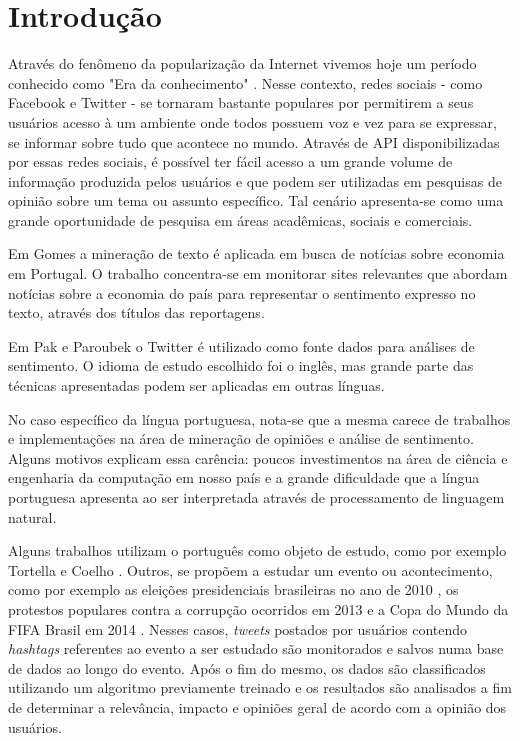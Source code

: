 \chapter{Introdução} \label{cap:1}

Através do fenômeno da popularização da Internet vivemos hoje um período conhecido como "Era da conhecimento" \cite{lastres1999informaccao}.
Nesse contexto, redes sociais - como Facebook e Twitter - se tornaram bastante populares por permitirem a seus usuários acesso à um ambiente onde todos possuem voz e vez para se expressar, se informar sobre tudo que acontece no mundo.
Através de \ac{API} disponibilizadas por essas redes sociais, é possível ter fácil acesso a um grande volume de informação produzida pelos usuários e que podem ser utilizadas em pesquisas de opinião sobre um tema ou assunto específico. Tal cenário apresenta-se como uma grande oportunidade de pesquisa em áreas acadêmicas, sociais e comerciais.

Em Gomes \cite{gomes2013text} a mineração de texto é aplicada em busca de notícias sobre economia em Portugal. O trabalho concentra-se em monitorar sites relevantes que abordam notícias sobre a economia do país para representar o sentimento expresso no texto, através dos títulos das reportagens.

Em Pak e Paroubek \cite{pak2010twitter} o Twitter é utilizado como fonte dados para análises de sentimento. O idioma de estudo escolhido foi o inglês, mas grande parte das técnicas apresentadas podem ser aplicadas em outras línguas.

No caso específico da língua portuguesa, nota-se que a mesma carece de trabalhos e implementações na área de mineração de opiniões e análise de sentimento. Alguns motivos explicam essa carência: poucos investimentos na área de ciência e engenharia da computação em nosso país e a grande dificuldade que a língua portuguesa apresenta ao ser interpretada através de processamento de linguagem natural. \cite{santos2000projecto}

Alguns trabalhos utilizam o português como objeto de estudo, como por exemplo Tortella e Coelho \cite{tortellaanalise}. Outros, se propõem a estudar um evento ou acontecimento, como por exemplo as eleições presidenciais brasileiras no ano de 2010 \cite{rodrigues2012characterizing}, os protestos populares contra a corrupção ocorridos em 2013 \cite{franca2014analise} e a Copa do Mundo da FIFA Brasil em 2014 \cite{carvalho2014mineraccao}. Nesses casos, \textit{tweets} postados por usuários contendo \textit{hashtags} referentes ao evento a ser estudado são monitorados e salvos numa base de dados ao longo do evento. Após o fim do mesmo, os dados são classificados utilizando um algoritmo previamente treinado e os resultados são analisados a fim de determinar a relevância, impacto e opiniões geral de acordo com a opinião dos usuários.

